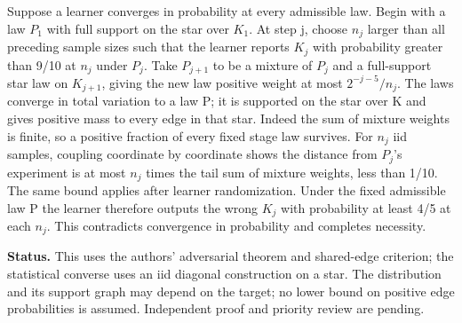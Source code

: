 \documentclass[11pt]{article}
\begin{document}
Suppose a learner converges in probability at every admissible law. Begin with a law \(P_{1}\) with full support on the star over \(K_{1}\). At step j, choose \(n_{j}\) larger than all preceding sample sizes such that the learner reports \(K_{j}\) with probability greater than 9/10 at \(n_{j}\) under \(P_{j}\). Take \(P_{j+1}\) to be a mixture of \(P_{j}\) and a full-support star law on \(K_{j+1}\), giving the new law positive weight at most \(2^{-j-5}/n_j\). The laws converge in total variation to a law P; it is supported on the star over K and gives positive mass to every edge in that star. Indeed the sum of mixture weights is finite, so a positive fraction of every fixed stage law survives. For \(n_{j}\) iid samples, coupling coordinate by coordinate shows the distance from \(P_{j}\)'s experiment is at most \(n_{j}\) times the tail sum of mixture weights, less than 1/10. The same bound applies after learner randomization. Under the fixed admissible law P the learner therefore outputs the wrong \(K_{j}\) with probability at least 4/5 at each \(n_{j}\). This contradicts convergence in probability and completes necessity.

\textbf{Status.} This uses the authors' adversarial theorem and shared-edge criterion; the statistical converse uses an iid diagonal construction on a star. The distribution and its support graph may depend on the target; no lower bound on positive edge probabilities is assumed. Independent proof and priority review are pending.
\end{document}
